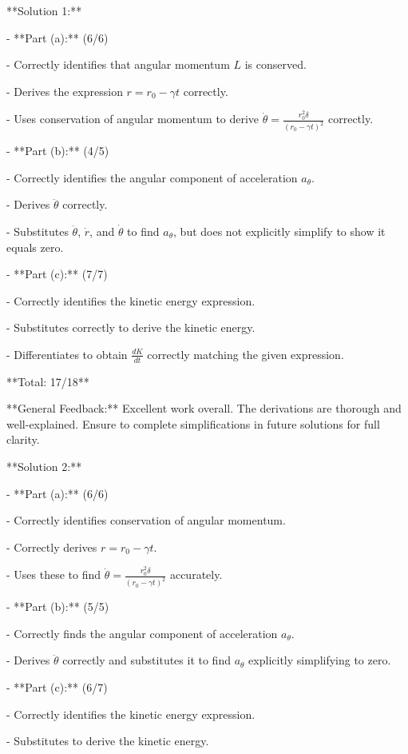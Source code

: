 \documentclass[a4paper,11pt]{article}
\begin{document}
**Solution 1:**

- **Part (a):** (6/6)

  - Correctly identifies that angular momentum \(L\) is conserved.
  
  - Derives the expression \(r = r_0 - \gamma t\) correctly.
  
  - Uses conservation of angular momentum to derive \(\dot{\theta} = \frac{r_0^2 \delta}{(r_0 - \gamma t)^2}\) correctly.

- **Part (b):** (4/5)

  - Correctly identifies the angular component of acceleration \(a_{\theta}\).
  
  - Derives \(\ddot{\theta}\) correctly.
  
  - Substitutes \(\ddot{\theta}\), \(\dot{r}\), and \(\dot{\theta}\) to find \(a_{\theta}\), but does not explicitly simplify to show it equals zero.

- **Part (c):** (7/7)

  - Correctly identifies the kinetic energy expression.
  
  - Substitutes correctly to derive the kinetic energy.
  
  - Differentiates to obtain \(\frac{dK}{dt}\) correctly matching the given expression.

**Total: 17/18**

**General Feedback:** Excellent work overall. The derivations are thorough and well-explained. Ensure to complete simplifications in future solutions for full clarity.

**Solution 2:**

- **Part (a):** (6/6)

  - Correctly identifies conservation of angular momentum.
  
  - Correctly derives \(r = r_0 - \gamma t\).
  
  - Uses these to find \(\dot{\theta} = \frac{r_0^2 \delta}{(r_0 - \gamma t)^2}\) accurately.

- **Part (b):** (5/5)

  - Correctly finds the angular component of acceleration \(a_{\theta}\).
  
  - Derives \(\ddot{\theta}\) correctly and substitutes it to find \(a_{\theta}\) explicitly simplifying to zero.

- **Part (c):** (6/7)

  - Correctly identifies the kinetic energy expression.
  
  - Substitutes to derive the kinetic energy.
  
\end{document}
